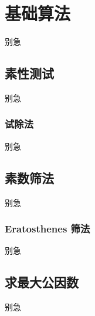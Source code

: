 
\section{基础算法}
\begin{frame}{别急}\end{frame} %
\subsection{素性测试}
\begin{frame}[c]
  \progressnow*
\end{frame}
\begin{frame}{别急}\end{frame} %
\subsubsection{试除法}
\begin{frame}[c]
  \progressnow
\end{frame}
\begin{frame}{别急}\end{frame} %
\subsection{素数筛法}
\begin{frame}[c]
  \progressnow*
\end{frame}
\begin{frame}{别急}\end{frame} %
\subsubsection{Eratosthenes 筛法}
\begin{frame}[c]
  \progressnow
\end{frame}
\begin{frame}{别急}\end{frame} %
\subsection{求最大公因数}
\begin{frame}[c]
  \progressnow*
\end{frame}
\begin{frame}{别急}\end{frame} %
